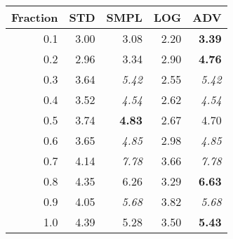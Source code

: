 \documentclass{standalone}
\begin{document}
\begin{tabular}{r|rrrr}
      \toprule
      Fraction & STD & SMPL & LOG & ADV\\
      \midrule
      0.1 & 3.00 & 3.08 & 2.20 & \textbf{3.39}\\
  0.2 & 2.96 & 3.34 & 2.90 & \textbf{4.76}\\
  0.3 & 3.64 & \emph{5.42} & 2.55 & \emph{5.42}\\
  0.4 & 3.52 & \emph{4.54} & 2.62 & \emph{4.54}\\
  0.5 & 3.74 & \textbf{4.83} & 2.67 & 4.70\\
  0.6 & 3.65 & \emph{4.85} & 2.98 & \emph{4.85}\\
  0.7 & 4.14 & \emph{7.78} & 3.66 & \emph{7.78}\\
  0.8 & 4.35 & 6.26 & 3.29 & \textbf{6.63}\\
  0.9 & 4.05 & \emph{5.68} & 3.82 & \emph{5.68}\\
  1.0 & 4.39 & 5.28 & 3.50 & \textbf{5.43}\\
  \bottomrule
\end{tabular}
\end{document}

